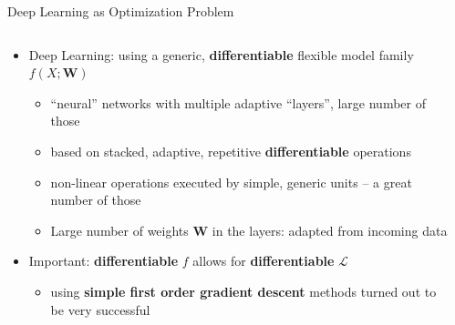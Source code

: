 \begin{frame}{Deep Learning as Optimization Problem}
\protect\hypertarget{deep-learning-as-optimization-problem}{}
\begin{columns}[T]
\begin{column}{0.4\textwidth}
\begin{itemize}
\tightlist
\item
  Deep Learning: using a generic, \textbf{differentiable} flexible model
  family \(f(X;\mathbf{W})\)

  \begin{itemize}
  \tightlist
  \item
    ``neural'' networks with multiple adaptive ``layers'', large number
    of those
  \item
    based on stacked, adaptive, repetitive \textbf{differentiable}
    operations
  \item
    non-linear operations executed by simple, generic units -- a great
    number of those
  \item
    Large number of weights \(\mathbf{W}\) in the layers: adapted from
    incoming data
  \end{itemize}
\item
  Important: \textbf{differentiable} \(f\) allows for
  \textbf{differentiable} \(\mathcal{L}\)

  \begin{itemize}
  \tightlist
  \item
    using \textbf{simple first order gradient descent} methods turned
    out to be very successful
  \end{itemize}
\end{itemize}
\end{column}

\begin{column}{0.6\textwidth}
\end{column}
\end{columns}
\end{frame}

